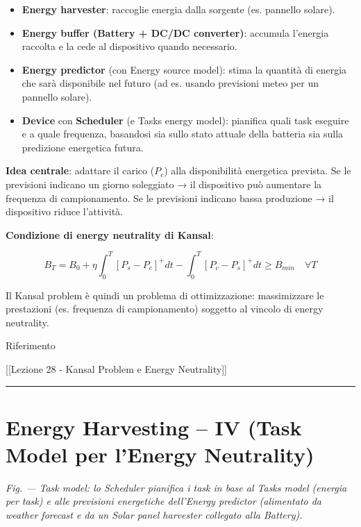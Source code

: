 \documentclass[
  italian,
  openany]{book}
\providecommand{\tightlist}{%
  \setlength{\itemsep}{0pt}\setlength{\parskip}{0pt}}
\begin{document}
\begin{itemize}
\tightlist
\item
  \textbf{Energy harvester}: raccoglie energia dalla sorgente (es.
  pannello solare).
\item
  \textbf{Energy buffer (Battery + DC/DC converter)}: accumula l'energia
  raccolta e la cede al dispositivo quando necessario.
\item
  \textbf{Energy predictor} (con Energy source model): stima la quantità
  di energia che sarà disponibile nel futuro (ad es. usando previsioni
  meteo per un pannello solare).
\item
  \textbf{Device} con \textbf{Scheduler} (e Tasks energy model):
  pianifica quali task eseguire e a quale frequenza, basandosi sia sullo
  stato attuale della batteria sia sulla predizione energetica futura.
\end{itemize}

\textbf{Idea centrale}: adattare il carico (\(P_c\)) alla disponibilità
energetica prevista. Se le previsioni indicano un giorno soleggiato → il
dispositivo può aumentare la frequenza di campionamento. Se le
previsioni indicano bassa produzione → il dispositivo riduce l'attività.

\textbf{Condizione di energy neutrality di Kansal}:

\[B_T = B_0 + \eta \int_0^T [P_s - P_c]^+ dt - \int_0^T [P_c - P_s]^+ dt \geq B_{min} \quad \forall T\]

Il Kansal problem è quindi un problema di ottimizzazione: massimizzare
le prestazioni (es. frequenza di campionamento) soggetto al vincolo di
energy neutrality.

\begin{calloutnote}{Riferimento}

{[}{[}Lezione 28 - Kansal Problem e Energy Neutrality{]}{]}

\end{calloutnote}

\begin{center}\rule{0.5\linewidth}{0.5pt}\end{center}

\section{Energy Harvesting -- IV (Task Model per l'Energy
Neutrality)}\label{energy-harvesting-iv-task-model-per-lenergy-neutrality}

\emph{Fig. --- Task model: lo Scheduler pianifica i task in base al
Tasks model (energia per task) e alle previsioni energetiche dell'Energy
predictor (alimentato da weather forecast e da un Solar panel harvester
collegato alla Battery).}
\end{document}
